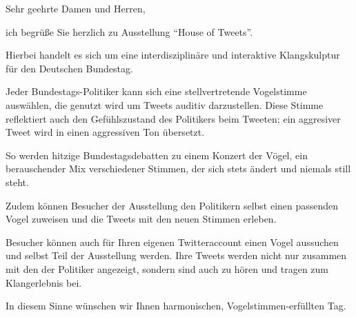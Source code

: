 \documentclass[a4paper,parskip,headheight=38pt,19pt]{scrartcl} %
\begin{document}
Sehr geehrte Damen und Herren,

ich begrüße Sie herzlich zu Ausstellung \enquote{House of Tweets}.

Hierbei handelt es sich um eine interdisziplinäre
und interaktive Klangskulptur für den Deutschen Bundestag.

Jeder Bundestags-Politiker kann sich eine stellvertretende Vogelstimme auswählen,
die genutzt wird um Tweets auditiv darzustellen.
Diese Stimme reflektiert auch den Gefühlszustand des Politikers beim Tweeten;
ein aggresiver Tweet wird in einen aggressiven Ton übersetzt.

So werden hitzige Bundestagsdebatten zu einem Konzert der Vögel,
ein berauschender Mix verschiedener Stimmen, der sich stets ändert und niemals still steht.

Zudem können Besucher der Ausstellung den Politikern selbst einen passenden Vogel
zuweisen und die Tweets mit den neuen Stimmen erleben.

Besucher können auch für Ihren eigenen Twitteraccount einen Vogel aussuchen
und selbst Teil der Ausstellung werden. Ihre Tweets werden nicht nur
zusammen mit den der Politiker angezeigt,
sondern sind auch zu hören und tragen zum Klangerlebnis bei.

In diesem Sinne wünschen wir Ihnen harmonischen, Vogelstimmen-erfüllten Tag.
\end{document}
